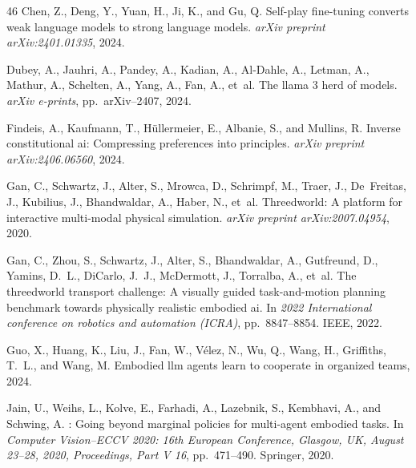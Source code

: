 \documentclass{article}
\theoremstyle{plain}
\theoremstyle{definition}
\theoremstyle{remark}
\begin{document}
\begin{thebibliography}{46}
Chen, Z., Deng, Y., Yuan, H., Ji, K., and Gu, Q.
\newblock Self-play fine-tuning converts weak language models to strong
  language models.
\newblock \emph{arXiv preprint arXiv:2401.01335}, 2024{}.

Dubey, A., Jauhri, A., Pandey, A., Kadian, A., Al-Dahle, A., Letman, A.,
  Mathur, A., Schelten, A., Yang, A., Fan, A., et~al.
\newblock The llama 3 herd of models.
\newblock \emph{arXiv e-prints}, pp.\  arXiv--2407, 2024.

Findeis, A., Kaufmann, T., H{\"u}llermeier, E., Albanie, S., and Mullins, R.
\newblock Inverse constitutional ai: Compressing preferences into principles.
\newblock \emph{arXiv preprint arXiv:2406.06560}, 2024.

Gan, C., Schwartz, J., Alter, S., Mrowca, D., Schrimpf, M., Traer, J.,
  De~Freitas, J., Kubilius, J., Bhandwaldar, A., Haber, N., et~al.
\newblock Threedworld: A platform for interactive multi-modal physical
  simulation.
\newblock \emph{arXiv preprint arXiv:2007.04954}, 2020.

Gan, C., Zhou, S., Schwartz, J., Alter, S., Bhandwaldar, A., Gutfreund, D.,
  Yamins, D.~L., DiCarlo, J.~J., McDermott, J., Torralba, A., et~al.
\newblock The threedworld transport challenge: A visually guided
  task-and-motion planning benchmark towards physically realistic embodied ai.
\newblock In \emph{2022 International conference on robotics and automation
  (ICRA)}, pp.\  8847--8854. IEEE, 2022.

Guo, X., Huang, K., Liu, J., Fan, W., Vélez, N., Wu, Q., Wang, H., Griffiths,
  T.~L., and Wang, M.
\newblock Embodied llm agents learn to cooperate in organized teams, 2024.

Jain, U., Weihs, L., Kolve, E., Farhadi, A., Lazebnik, S., Kembhavi, A., and
  Schwing, A.
: Going beyond marginal policies for multi-agent
  embodied tasks.
\newblock In \emph{Computer Vision--ECCV 2020: 16th European Conference,
  Glasgow, UK, August 23--28, 2020, Proceedings, Part V 16}, pp.\  471--490.
  Springer, 2020.


\end{thebibliography}
\end{document}
